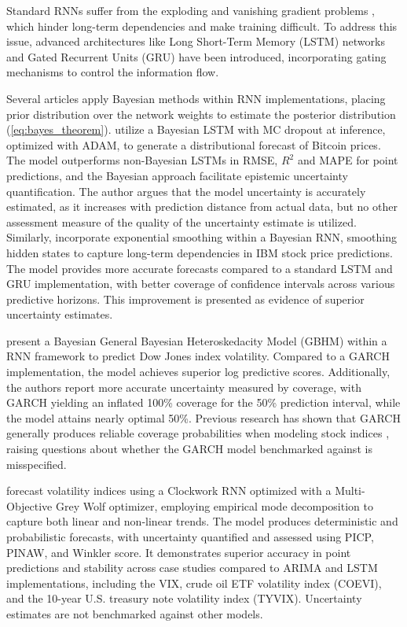 Standard RNNs suffer from the exploding and vanishing gradient problems \parencite{Pascanu2013Difficulty}, which hinder long-term dependencies and make training difficult. To address this issue, advanced architectures like Long Short-Term Memory (LSTM) networks \parencite{Hochreiter1997LSTM} and Gated Recurrent Units (GRU) \parencite{Cho2014Learning} have been introduced, incorporating gating mechanisms to control the information flow. 

Several articles apply Bayesian methods within RNN implementations, placing prior distribution over the network weights to estimate the posterior distribution (\ref{eq:bayes_theorem}). \textcite{Hassan2024Bitcoin} utilize a Bayesian LSTM with MC dropout at inference, optimized with ADAM, to generate a distributional forecast of Bitcoin prices. The model outperforms non-Bayesian LSTMs in RMSE, $R^2$ and MAPE for point predictions, and the Bayesian approach facilitate epistemic uncertainty quantification. The author argues that the model uncertainty is accurately estimated, as it increases with prediction distance from actual data, but no other assessment measure of the quality of the uncertainty estimate is utilized. Similarly, \textcite{Dixon2022Industrial} incorporate exponential smoothing within a Bayesian RNN, smoothing hidden states to capture long-term dependencies in IBM stock price predictions. The model provides more accurate forecasts compared to a standard LSTM and GRU implementation, with better coverage of confidence intervals across various predictive horizons. This improvement is presented as evidence of superior uncertainty estimates.

\textcite{Parker2021BayesianHeteroskedastic} present a Bayesian General Bayesian Heteroskedacity Model (GBHM) within a RNN framework to predict Dow Jones index volatility. Compared to a GARCH implementation, the model achieves superior log predictive scores. Additionally, the authors report more accurate uncertainty measured by coverage, with GARCH yielding an inflated 100\% coverage for the 50\% prediction interval, while the model attains nearly optimal 50\%. Previous research has shown that GARCH generally produces reliable coverage probabilities when modeling stock indices \parencite{Rippel2011ValueAR}, raising questions about whether the GARCH model benchmarked against is misspecified.

\textcite{Tian2023} forecast volatility indices using a Clockwork RNN optimized with a Multi-Objective Grey Wolf optimizer, employing empirical mode decomposition to capture both linear and non-linear trends. The model produces deterministic and probabilistic forecasts, with uncertainty quantified and assessed using PICP, PINAW, and Winkler score. It demonstrates superior accuracy in point predictions and stability across case studies compared to ARIMA and LSTM implementations, including the VIX, crude oil ETF volatility index (COEVI), and the 10-year U.S. treasury note volatility index (TYVIX). Uncertainty estimates are not benchmarked against other models. 

